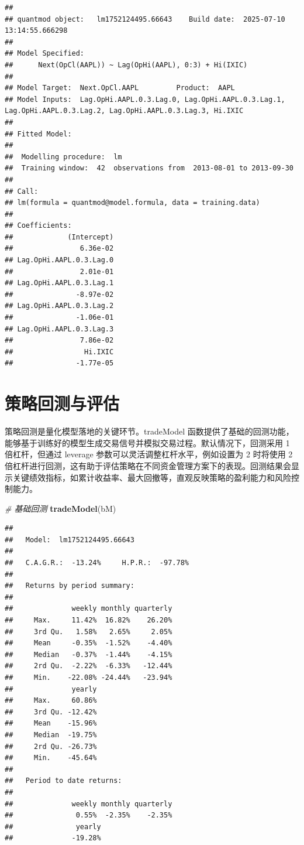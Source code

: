 \documentclass[]{ctexbook}
\newenvironment{Shaded}{\begin{snugshade}}{\end{snugshade}}
\newcommand{\CommentTok}[1]{\textcolor[rgb]{0.56,0.35,0.01}{\textit{#1}}}
\newcommand{\FunctionTok}[1]{\textcolor[rgb]{0.13,0.29,0.53}{\textbf{#1}}}
\newcommand{\NormalTok}[1]{#1}
\begin{document}
\begin{verbatim}
## 
## quantmod object:   lm1752124495.66643    Build date:  2025-07-10 13:14:55.666298 
## 
## Model Specified: 
##      Next(OpCl(AAPL)) ~ Lag(OpHi(AAPL), 0:3) + Hi(IXIC) 
## 
## Model Target:  Next.OpCl.AAPL         Product:  AAPL 
## Model Inputs:  Lag.OpHi.AAPL.0.3.Lag.0, Lag.OpHi.AAPL.0.3.Lag.1, Lag.OpHi.AAPL.0.3.Lag.2, Lag.OpHi.AAPL.0.3.Lag.3, Hi.IXIC 
## 
## Fitted Model: 
## 
##  Modelling procedure:  lm 
##  Training window:  42  observations from  2013-08-01 to 2013-09-30
## 
## Call:
## lm(formula = quantmod@model.formula, data = training.data)
## 
## Coefficients:
##             (Intercept)  
##                6.36e-02  
## Lag.OpHi.AAPL.0.3.Lag.0  
##                2.01e-01  
## Lag.OpHi.AAPL.0.3.Lag.1  
##               -8.97e-02  
## Lag.OpHi.AAPL.0.3.Lag.2  
##               -1.06e-01  
## Lag.OpHi.AAPL.0.3.Lag.3  
##                7.86e-02  
##                 Hi.IXIC  
##               -1.77e-05
\end{verbatim}

\section{策略回测与评估}\label{ux7b56ux7565ux56deux6d4bux4e0eux8bc4ux4f30}

策略回测是量化模型落地的关键环节。tradeModel 函数提供了基础的回测功能，能够基于训练好的模型生成交易信号并模拟交易过程。默认情况下，回测采用 1 倍杠杆，但通过 leverage 参数可以灵活调整杠杆水平，例如设置为 2 时将使用 2 倍杠杆进行回测，这有助于评估策略在不同资金管理方案下的表现。回测结果会显示关键绩效指标，如累计收益率、最大回撤等，直观反映策略的盈利能力和风险控制能力。

\begin{Shaded}
\begin{Highlighting}[]
\CommentTok{\# 基础回测}
\FunctionTok{tradeModel}\NormalTok{(bM)}
\end{Highlighting}
\end{Shaded}

\begin{verbatim}
## 
##   Model:  lm1752124495.66643 
## 
##   C.A.G.R.:  -13.24%     H.P.R.:  -97.78% 
## 
##   Returns by period summary:
## 
##              weekly monthly quarterly
##     Max.     11.42%  16.82%    26.20%
##     3rd Qu.   1.58%   2.65%     2.05%
##     Mean     -0.35%  -1.52%    -4.40%
##     Median   -0.37%  -1.44%    -4.15%
##     2rd Qu.  -2.22%  -6.33%   -12.44%
##     Min.    -22.08% -24.44%   -23.94%
##              yearly
##     Max.     60.86%
##     3rd Qu. -12.42%
##     Mean    -15.96%
##     Median  -19.75%
##     2rd Qu. -26.73%
##     Min.    -45.64%
## 
##   Period to date returns:
## 
##              weekly monthly quarterly
##               0.55%  -2.35%    -2.35%
##               yearly
##              -19.28%
\end{verbatim}
\end{document}
